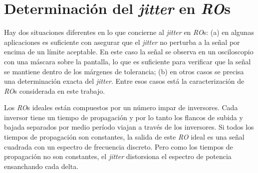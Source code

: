 \section{Determinación del \textit{jitter} en \emph{RO}s}
\label{sec:jitter}

Hay dos situaciones diferentes en lo que concierne al \textit{jitter} en \textit{RO}s:
(a) en algunas aplicaciones es suficiente con asegurar que el \textit{jitter} no perturba a la señal por encima de un límite aceptable.
En este caso la señal se observa en un osciloscopio con una máscara sobre la pantalla, lo que es suficiente para verificar que la señal se mantiene dentro de los márgenes de tolerancia;
(b) en otros casos se precisa una determinación exacta del \textit{jitter}.
Entre esos casos está la caracterización de \textit{RO}s considerada en este trabajo.

Los \textit{RO}s ideales están compuestos por un número impar de inversores.
Cada inversor tiene un tiempo de propagación y por lo tanto los flancos de subida y bajada separados por medio período viajan a través de los inversores.
Si todos los tiempos de propagación son constantes, la salida de este \textit{RO} ideal es una señal cuadrada con un espectro de frecuencia discreto.
Pero como los tiempos de propagación no son constantes, el \textit{jitter} distorsiona el espectro de potencia ensanchando cada delta.

